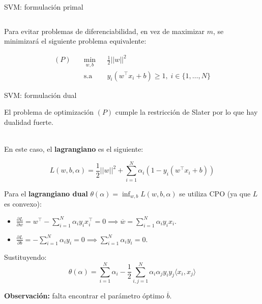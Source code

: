 \documentclass[handout, 9pt]{beamer}
\begin{document}
\begin{frame}{SVM: formulación primal}
\begin{columns}
\end{columns} 

Para evitar problemas de diferenciabilidad, en vez de maximizar $m$, se minimizará el siguiente problema equivalente:

\begin{equation*}
\begin{aligned}
(P)\quad & \underset{w,b}{\min}
& & \frac{1}{2}||w||^2\\
& \text{s.a}
& & y_i (w^\top x_i +b) \geq 1, \; i \in\{ 1, \ldots, N\}
\end{aligned}
\end{equation*}
	
\end{frame}

\begin{frame}{SVM: formulación dual}

El problema de optimización $(P)$ cumple la restricción de Slater por lo que hay dualidad fuerte.\\~\

En este caso, el \textbf{lagrangiano} es el siguiente:

\begin{equation*}
    L(w,b,\alpha) = \frac{1}{2}||w||^2 + \sum\limits_{i=1}^{N} \alpha_i \left(1-y_i (w^\top x_i +b)\right)\label{eq:lagrangiaano_svm}
\end{equation*}

Para el \textbf{lagrangiano dual} $\theta(\alpha)=\inf_{w,b} L(w,b,\alpha)$ se utiliza CPO (ya que $L$ es convexo):

\begin{itemize}
	\item $\frac{\partial L}{\partial w} = w^\top - \sum_{i=1}^N \alpha_i y_i x_i^\top = 0 \implies \overline{w} = \sum_{i=1}^N \alpha_i y_i x_i$.
	\item $\frac{\partial L}{\partial b} = -\sum_{i=1}^N \alpha_i y_i = 0 \implies \sum_{i=1}^N \alpha_i y_i = 0$.
\end{itemize}

\vspace{.2cm}Sustituyendo:
\begin{equation*}
	\theta(\alpha) = \sum_{i=1}^N \alpha_i - \frac{1}{2} \sum_{i,j=1}^N \alpha_i \alpha_j y_i y_j \langle x_i,x_j\rangle
\end{equation*}

\textbf{Observación:} falta encontrar el parámetro óptimo $\overline{b}$.


\end{frame}
\end{document}

